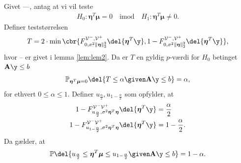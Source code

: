 \begin{lem} \label{lem:lem3}
Givet ---, antag at vi vil teste
\begin{align*}
H_0: \boldsymbol{\eta}^T \boldsymbol{\mu}=0 \quad \text{imod} \quad H_1: \boldsymbol{\eta}^T \boldsymbol{\mu} \neq 0.
\end{align*}
Definer teststørrelsen
\begin{align}
T=2 \cdot \min\cbr{F_{0, \sigma^2 \Vert \boldsymbol{\eta} \Vert_2^2}^{\mathcal{V}^-, \mathcal{V}^+} \del{\boldsymbol{\eta}^T \y}, 1 - F_{0, \sigma^2 \Vert \boldsymbol{\eta} \Vert_2^2}^{\mathcal{V}^-, \mathcal{V}^+} \del{\boldsymbol{\eta}^T \y}}, \label{eq:post_1.18}
\end{align}
hvor -- er givet i lemma \ref{lem:lem2}.
Da er \(T\) en gyldig \(p\)-værdi for \(H_0\) betinget \(\mathbf{A} \y \leq b\)
\begin{align*}
\mathbb{P}_{\boldsymbol{\eta}^T \boldsymbol{\mu}=0} \del{T \leq \alpha \given \mathbf{A} \y \leq b} = \alpha,
\end{align*}
for ethvert \(0 \leq \alpha \leq 1\). 
Definer \(u_{\frac{\alpha}{2}}, u_{1-\frac{\alpha}{2}}\) som opfylder, at
\begin{align*}
1-F_{u_{\frac{\alpha}{2}}, \sigma^2 \boldsymbol{\eta}^T  \boldsymbol{\eta} }^{\mathcal{V}^- \mathcal{V}^+} \del{\boldsymbol{\eta}^T \y} &= \frac{\alpha}{2} \\
1-F_{u_{1-\frac{\alpha}{2}}, \sigma^2 \boldsymbol{\eta}^T  \boldsymbol{\eta} }^{\mathcal{V}^- \mathcal{V}^+} \del{\boldsymbol{\eta}^T \y} &= 1-\frac{\alpha}{2}.
\end{align*}
Da gælder, at
\begin{align*}
\mathbb{P} \del{u_{\frac{\alpha}{2}} \leq  \boldsymbol{\eta}^T \boldsymbol{\mu} \leq  u_{1-\frac{\alpha}{2}} \given \mathbf{A} \y \leq b} = 1- \alpha.
\end{align*}
\end{lem}




